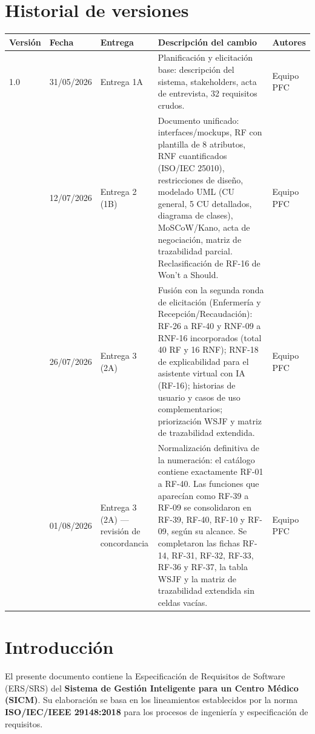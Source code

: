 \documentclass[11pt,a4paper]{article}
\begin{document}
	\section*{Historial de versiones}
	\begin{longtable}{@{}p{1.3cm}p{1.8cm}p{2.3cm}p{7.2cm}p{3cm}@{}}
		\toprule
		\textbf{Versión} & \textbf{Fecha} & \textbf{Entrega} & \textbf{Descripción del cambio} & \textbf{Autores} \\
		\midrule
		\endhead
		1.0 & 31/05/2026 & Entrega 1A & Planificación y elicitación base: descripción del sistema, stakeholders, acta de entrevista, 32 requisitos crudos. & Equipo PFC \\
		\addlinespace
		2.0 & 12/07/2026 & Entrega 2 (1B) & Documento unificado: interfaces/mockups, RF con plantilla de 8 atributos, RNF cuantificados (ISO/IEC 25010), restricciones de diseño, modelado UML (CU general, 5 CU detallados, diagrama de clases), MoSCoW/Kano, acta de negociación, matriz de trazabilidad parcial. Reclasificación de RF-16 de Won't a Should. & Equipo PFC \\
		\addlinespace
		3.0 & 26/07/2026 & Entrega 3 (2A) & Fusión con la segunda ronda de elicitación (Enfermería y Recepción/Recaudación): RF-26 a RF-40 y RNF-09 a RNF-16 incorporados (total 40 RF y 16 RNF); RNF-18 de explicabilidad para el asistente virtual con IA (RF-16); historias de usuario y casos de uso complementarios; priorización WSJF y matriz de trazabilidad extendida. & Equipo PFC \\
		\addlinespace
		3.1 & 01/08/2026 & Entrega 3 (2A) --- revisión de concordancia & Normalización definitiva de la numeración: el catálogo contiene exactamente RF-01 a RF-40. Las funciones que aparecían como RF-39 a RF-09 se consolidaron en RF-39, RF-40, RF-10 y RF-09, según su alcance. Se completaron las fichas RF-14, RF-31, RF-32, RF-33, RF-36 y RF-37, la tabla WSJF y la matriz de trazabilidad extendida sin celdas vacías. & Equipo PFC \\
		\bottomrule
	\end{longtable}
	
	
	\tableofcontents
	\clearpage
	
	
	\section{ Introducción}
	
	El presente documento contiene la Especificación de Requisitos de Software
	(ERS/SRS) del \textbf{Sistema de Gestión Inteligente para un Centro Médico
		(SICM)}. Su elaboración se basa en los lineamientos establecidos por la norma
	\textbf{ISO/IEC/IEEE 29148:2018} para los procesos de ingeniería y
	especificación de requisitos.
	
\end{document}
